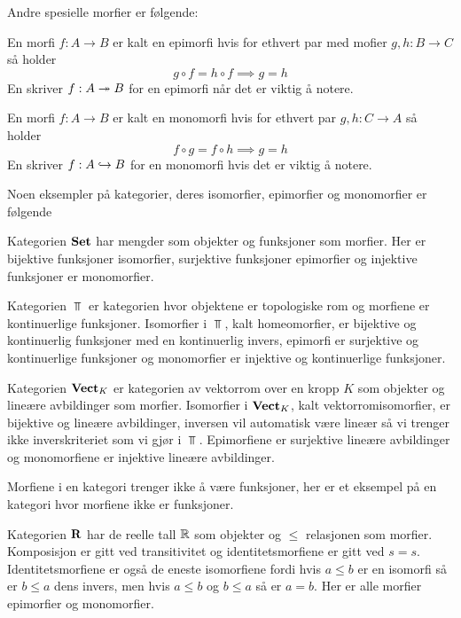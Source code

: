 Andre spesielle morfier er følgende:
\begin{definisjon}\label{Def:Epi}
    En morfi $f: A\to B$ er kalt en epimorfi hvis for ethvert par med mofier $g,h: B\to C$ så holder
    \[g\circ f = h\circ f \implies g = h\]
    En skriver $f:A\twoheadrightarrow B$ for en epimorfi når det er viktig å notere.
\end{definisjon}

\begin{definisjon}\label{Def:Mono}
    En morfi $f: A\to B$ er kalt en monomorfi hvis for ethvert par $g,h: C\to A$ så holder
    \[f\circ g = f\circ h \implies g=h\]
    En skriver $f: A\hookrightarrow B$ for en monomorfi hvis det er viktig å notere.
\end{definisjon}

Noen eksempler på kategorier, deres isomorfier, epimorfier og monomorfier er følgende
\begin{eksempel}\label{Ex:Set}
    Kategorien $\textnormal{\textbf{Set}}$ har mengder som objekter og funksjoner som morfier. Her er bijektive funksjoner isomorfier, surjektive funksjoner epimorfier og injektive funksjoner er monomorfier.
\end{eksempel}

\begin{eksempel}\label{Ex:TopKat}
    Kategorien $\Top$ er kategorien hvor objektene er topologiske rom og morfiene er kontinuerlige funksjoner. Isomorfier i $\Top$, kalt homeomorfier, er bijektive og kontinuerlig funksjoner med en kontinuerlig invers, epimorfi er surjektive og kontinuerlige funksjoner og monomorfier er injektive og kontinuerlige funksjoner. 
\end{eksempel}

\begin{eksempel}\label{Ex:VektKat}
    Kategorien $\textnormal{\textbf{Vect}}_K$ er kategorien av vektorrom over en kropp $K$ som objekter og lineære avbildinger som morfier. Isomorfier i $\textnormal{\textbf{Vect}}_K$, kalt vektorromisomorfier, er bijektive og lineære avbildinger, inversen vil automatisk være lineær så vi trenger ikke inverskriteriet som vi gjør i $\Top$. Epimorfiene er surjektive lineære avbildinger og monomorfiene er injektive lineære avbildinger.
\end{eksempel}

Morfiene i en kategori trenger ikke å være funksjoner, her er et eksempel på en kategori hvor morfiene ikke er funksjoner.
\begin{eksempel}\label{Ex:RPoset}
    Kategorien $\textnormal{\textbf{{R}}}$ har de reelle tall $\mathbb{R}$ som objekter og $\leq$ relasjonen som morfier. Komposisjon er gitt ved transitivitet og identitetsmorfiene er gitt ved $s=s$. Identitetsmorfiene er også de eneste isomorfiene fordi hvis $a\leq b$ er en isomorfi så er $b\leq a$ dens invers, men hvis $a\leq b$ og $b\leq a$ så er $a=b$. Her er alle morfier epimorfier og monomorfier.
\end{eksempel}

